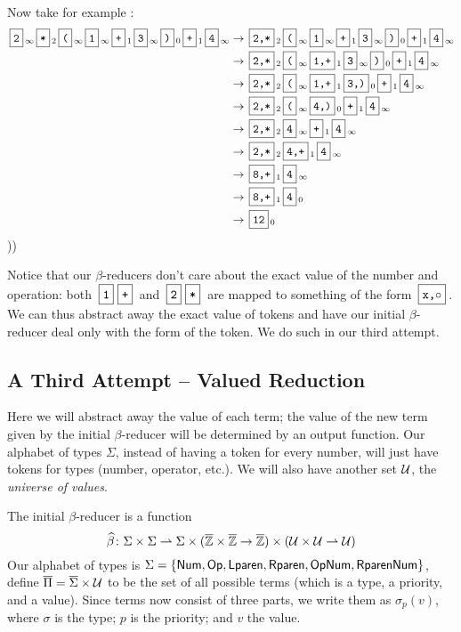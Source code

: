 \documentclass{llncs}
\begin{document}
Now take for example :
\begin{align*}
    \mbt2_\oo \mbt*_2 \mbt(_\oo \mbt1_\oo \mbt+_1 \mbt3_\oo \mbt)_0 \mbt+_1 \mbt4_\oo &\to \mbt{2,*}_2 \mbt(_\oo \mbt1_\oo \mbt+_1 \mbt3_\oo \mbt)_0 \mbt+_1 \mbt4_\oo\\
        &\to \mbt{2,*}_2 \mbt(_\oo \mbt{1,+}_1 \mbt3_\oo \mbt)_0\mbt+_1 \mbt4_\oo\\
        &\to \mbt{2,*}_2 \mbt(_\oo \mbt{1,+}_1 \mbt{3,)}_0 \mbt+_1 \mbt4_\oo\\
        &\to \mbt{2,*}_2 \mbt(_\oo \mbt{4,)}_0 \mbt+_1 \mbt4_\oo\\
        &\to \mbt{2,*}_2 \mbt4_\oo \mbt+_1 \mbt4_\oo\\
        &\to \mbt{2,*}_2 \mbt{4,+}_1 \mbt4_\oo\\
        &\to \mbt{8,+}_1 \mbt4_\oo\\
        &\to \mbt{8,+}_1 \mbt4_0\\
        &\to \mbt{12}_0
\end{align*}
\gobble)\gobble)

Notice that our $\beta$-reducers don't care about the exact value of the number and operation: both $\mbt1\mbt+$ and $\mbt2\mbt*$ are mapped to something of the form $\mbt{x,$\circ$}$.
We can thus abstract away the exact value of tokens and have our initial $\beta$-reducer deal only with the form of the token.
We do such in our third attempt.

\subsection{A Third Attempt -- Valued Reduction} \label{valued-reduction}

Here we will abstract away the value of each term; the value of the new term given by the initial $\beta$-reducer will be determined by an output function.
Our alphabet of types $\Sigma$, instead of having a token for every number, will just have tokens for types (number, operator, etc.).
We will also have another set $\mathcal U$, the \textit{universe of values}.

The initial $\beta$-reducer is a function
\[ \widehat\beta \colon \Sigma\times\Sigma \rightharpoonup \Sigma\times(\overline{\mathbb Z}\times\overline{\mathbb Z}\to\overline{\mathbb Z})\times(\mathcal U\times\mathcal U\rightharpoonup\mathcal U) \]
Our alphabet of types is $\Sigma=\set{\NUM,\OP,\LPAREN,\RPAREN,\OP\NUM,\RPAREN\NUM}$, define $\overline\Pi=\overline\Sigma\times\mathcal U$ to be the set of all possible terms (which is a type, a priority, and a value).
Since terms now consist of three parts, we write them as $\sigma_p(v)$, where $\sigma$ is the type; $p$ is the priority; and $v$ the value.
\end{document}
